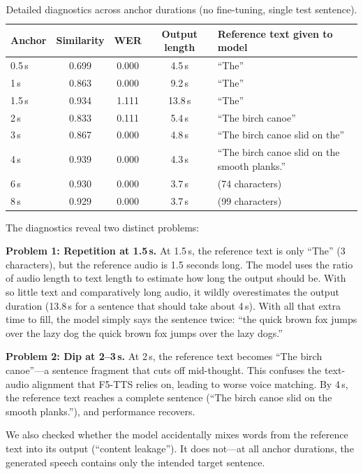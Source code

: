 \documentclass[11pt, a4paper]{article}
\begin{document}
\begin{table}[H]
\centering
\caption{Detailed diagnostics across anchor durations (no fine-tuning, single test sentence).}
\label{tab:diag}
\small
\begin{tabular}{@{}l c c c l@{}}
\toprule
\textbf{Anchor} & \textbf{Similarity} & \textbf{WER} & \textbf{Output length} & \textbf{Reference text given to model} \\
\midrule
0.5\,s & 0.699 & 0.000 & 4.5\,s & ``The'' \\
1\,s   & 0.863 & 0.000 & 9.2\,s & ``The'' \\
1.5\,s & 0.934 & 1.111 & 13.8\,s & ``The'' \\
2\,s   & 0.833 & 0.111 & 5.4\,s & ``The birch canoe'' \\
3\,s   & 0.867 & 0.000 & 4.8\,s & ``The birch canoe slid on the'' \\
4\,s   & 0.939 & 0.000 & 4.3\,s & ``The birch canoe slid on the smooth planks.'' \\
6\,s   & 0.930 & 0.000 & 3.7\,s & (74 characters) \\
8\,s   & 0.929 & 0.000 & 3.7\,s & (99 characters) \\
\bottomrule
\end{tabular}
\end{table}

The diagnostics reveal two distinct problems:

\textbf{Problem 1: Repetition at 1.5\,s.} At 1.5\,s, the reference text is only ``The'' (3 characters), but the reference audio is 1.5 seconds long. The model uses the ratio of audio length to text length to estimate how long the output should be. With so little text and comparatively long audio, it wildly overestimates the output duration (13.8\,s for a sentence that should take about 4\,s). With all that extra time to fill, the model simply says the sentence twice: ``the quick brown fox jumps over the lazy dog the quick brown fox jumps over the lazy dogs.''

\textbf{Problem 2: Dip at 2--3\,s.} At 2\,s, the reference text becomes ``The birch canoe''---a sentence fragment that cuts off mid-thought. This confuses the text-audio alignment that F5-TTS relies on, leading to worse voice matching. By 4\,s, the reference text reaches a complete sentence (``The birch canoe slid on the smooth planks.''), and performance recovers.

We also checked whether the model accidentally mixes words from the reference text into its output (``content leakage''). It does not---at all anchor durations, the generated speech contains only the intended target sentence.
\end{document}
